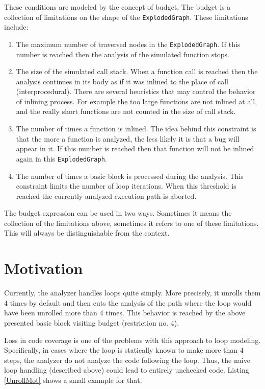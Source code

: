 \documentclass[oneside, a4paper, 12pt]{article}
\theoremstyle{definition}
\begin{document}
These conditions are modeled by the concept of budget.
The budget is a collection of limitations on the shape of the \texttt{ExplodedGraph}.
These limitations include:
\begin{enumerate}  
	\item The maximum number of traversed nodes in the \texttt{ExplodedGraph}. 
	If 	this number is reached then the analysis of the simulated function stops.
	\item The size of the simulated call stack. When a function call is 
	reached then the analysis continues in its body as if it was inlined to the 
	place of call (interprocedural). There are several heuristics that may control 
	the	behavior of inlining process. For example the too large functions are 
	not	inlined at all, and the really short functions are not counted in the 
	size of	call stack.
	\item The number of times a function is inlined. The idea behind this
	constraint is that the more a function is analyzed, the less likely it 
	is that a 	bug will appear in it. If this number is reached then that 
	function will not be inlined again in this \texttt{ExplodedGraph}.
	\item The number of times a basic block is processed during the 
	analysis. This	constraint limits the number of loop iterations. When this 
	threshold is reached the currently analyzed execution path is aborted.
\end{enumerate}


The budget expression can be used in two ways. Sometimes it means the
collection of the limitations above, sometimes it refers to one of these
limitations. This will always be distinguishable from the context.

\section{Motivation}
Currently, the analyzer handles loops quite simply. More precisely, it unrolls 
them 4 times by default and then cuts the analysis of the path where the loop 
would have been unrolled more than 4 times. This behavior is reached by the 
above presented basic block visiting budget (restriction no. 4).

Loss in code coverage is one of the problems with this approach to loop
modeling. Specifically, in cases where the loop is statically known to make 
more than 4 steps, the analyzer do not analyze the code following the loop. 
Thus, the naive loop handling (described above) could lead to entirely 
unchecked code.
Listing \ref{UnrollMot} shows a small example for that.
\end{document}

